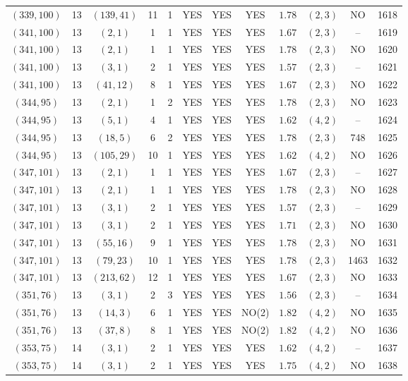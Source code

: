 \begin{longtable}{|c|c|c|c|c|c|c|c|c|c|c|c|}
$(339,100)$ & 13 & $(139,41)$ & 11 & 1 & YES & YES & YES & $1.78$ & $(2,3)$ & NO & 1618\\
$(341,100)$ & 13 & $(2,1)$ & 1 & 1 & YES & YES & YES & $1.67$ & $(2,3)$ & -- & 1619\\
$(341,100)$ & 13 & $(2,1)$ & 1 & 1 & YES & YES & YES & $1.78$ & $(2,3)$ & NO & 1620\\
$(341,100)$ & 13 & $(3,1)$ & 2 & 1 & YES & YES & YES & $1.57$ & $(2,3)$ & -- & 1621\\
$(341,100)$ & 13 & $(41,12)$ & 8 & 1 & YES & YES & YES & $1.67$ & $(2,3)$ & NO & 1622\\
$(344,95)$ & 13 & $(2,1)$ & 1 & 2 & YES & YES & YES & $1.78$ & $(2,3)$ & NO & 1623\\
$(344,95)$ & 13 & $(5,1)$ & 4 & 1 & YES & YES & YES & $1.62$ & $(4,2)$ & -- & 1624\\
$(344,95)$ & 13 & $(18,5)$ & 6 & 2 & YES & YES & YES & $1.78$ & $(2,3)$ & 748 & 1625\\
$(344,95)$ & 13 & $(105,29)$ & 10 & 1 & YES & YES & YES & $1.62$ & $(4,2)$ & NO & 1626\\
$(347,101)$ & 13 & $(2,1)$ & 1 & 1 & YES & YES & YES & $1.67$ & $(2,3)$ & -- & 1627\\
$(347,101)$ & 13 & $(2,1)$ & 1 & 1 & YES & YES & YES & $1.78$ & $(2,3)$ & NO & 1628\\
$(347,101)$ & 13 & $(3,1)$ & 2 & 1 & YES & YES & YES & $1.57$ & $(2,3)$ & -- & 1629\\
$(347,101)$ & 13 & $(3,1)$ & 2 & 1 & YES & YES & YES & $1.71$ & $(2,3)$ & NO & 1630\\
$(347,101)$ & 13 & $(55,16)$ & 9 & 1 & YES & YES & YES & $1.78$ & $(2,3)$ & NO & 1631\\
$(347,101)$ & 13 & $(79,23)$ & 10 & 1 & YES & YES & YES & $1.78$ & $(2,3)$ & 1463 & 1632\\
$(347,101)$ & 13 & $(213,62)$ & 12 & 1 & YES & YES & YES & $1.67$ & $(2,3)$ & NO & 1633\\
$(351,76)$ & 13 & $(3,1)$ & 2 & 3 & YES & YES & YES & $1.56$ & $(2,3)$ & -- & 1634\\
$(351,76)$ & 13 & $(14,3)$ & 6 & 1 & YES & YES & NO(2) & $1.82$ & $(4,2)$ & NO & 1635\\
$(351,76)$ & 13 & $(37,8)$ & 8 & 1 & YES & YES & NO(2) & $1.82$ & $(4,2)$ & NO & 1636\\
$(353,75)$ & 14 & $(3,1)$ & 2 & 1 & YES & YES & YES & $1.62$ & $(4,2)$ & -- & 1637\\
$(353,75)$ & 14 & $(3,1)$ & 2 & 1 & YES & YES & YES & $1.75$ & $(4,2)$ & NO & 1638\\

\end{longtable}
